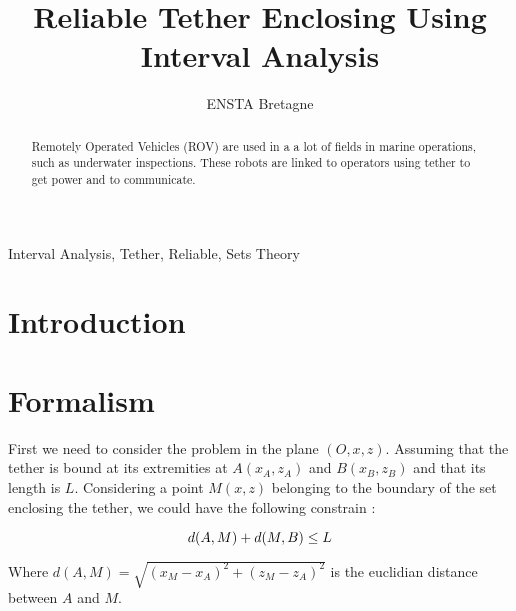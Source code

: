 \documentclass[conference]{IEEEtran}
\begin{document}
    \title{Reliable Tether Enclosing Using Interval Analysis}

    \author{ ENSTA Bretagne}

    \maketitle

    \begin{abstract}
        Remotely Operated Vehicles (ROV) are used in a a lot of fields in marine operations, such as
        underwater inspections. These robots are linked to operators using tether to get power and
        to communicate.
    \end{abstract}

    \begin{IEEEkeywords}
        Interval Analysis, Tether, Reliable, Sets Theory
    \end{IEEEkeywords}

    \section{Introduction}

    \section{Formalism}
        First we need to consider the problem in the plane $(O, x, z)$. Assuming that the tether is 
        bound at its extremities at $A (x_A, z_A)$ and $B (x_B, z_B)$ and that its length is $L$. 
        Considering a point $M (x, z)$ belonging to the boundary of the set enclosing the tether,
        we could have the following constrain :

        \begin{equation}
            d(A, M) + d(M, B) \leq L \\
        \end{equation}

        Where $d(A, M) = \sqrt{(x_M - x_A)^2 + (z_M - z_A)^2}$ is the euclidian distance between
        $A$ and $M$.
\end{document}
